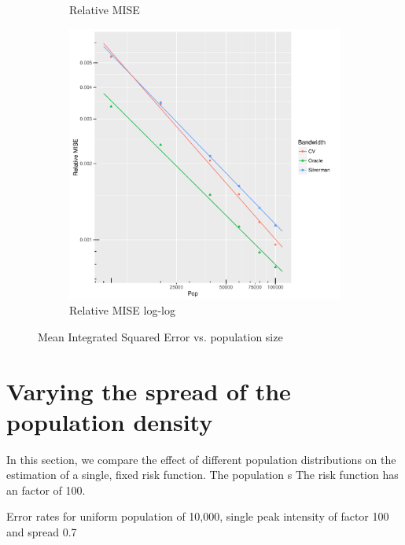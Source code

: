 \begin{figure}[htbp]
\begin{subfigure}[b]{0.3\textwidth}
    \caption{Relative MISE}
    \end{subfigure}
    \begin{subfigure}[b]{0.3\textwidth}
    \includegraphics[width=\textwidth]{results/by_pop_size/RMISE-vs-population-log-log}
    \caption{Relative MISE log-log}
    \end{subfigure}
    \caption[MISE: by population size]{Mean Integrated Squared Error vs. population size}
    \label{fig:ise:unifNpop_1h}
\end{figure}


\section{Varying the spread of the population density}
\label{sec:results:pSD_100_1h}

In this section, we compare the effect of different population distributions on the estimation of a single, fixed risk function.
The population s
The risk function has an \gls{factor} of 100.

\begin{table}[htbp]
\centering

\caption{Error rates for uniform population of 10,000, single peak intensity of \gls{factor} 100 and \gls{spread} 0.7}
\label{tab:results:p0.7_100_1.0_1h}
\end{table}


